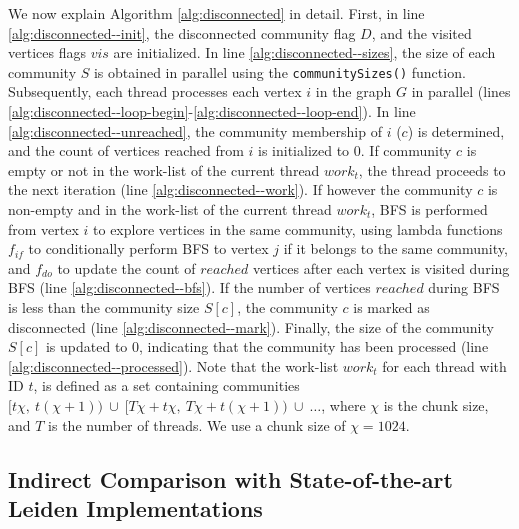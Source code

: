 We now explain Algorithm \ref{alg:disconnected} in detail. First, in line \ref{alg:disconnected--init}, the disconnected community flag $D$, and the visited vertices flags $vis$ are initialized. In line \ref{alg:disconnected--sizes}, the size of each community $S$ is obtained in parallel using the \texttt{communitySizes()} function. Subsequently, each thread processes each vertex $i$ in the graph $G$ in parallel (lines \ref{alg:disconnected--loop-begin}-\ref{alg:disconnected--loop-end}). In line \ref{alg:disconnected--unreached}, the community membership of $i$ ($c$) is determined, and the count of vertices reached from $i$ is initialized to $0$. If community $c$ is empty or not in the work-list of the current thread $work_t$, the thread proceeds to the next iteration (line \ref{alg:disconnected--work}). If however the community $c$ is non-empty and in the work-list of the current thread $work_t$, BFS is performed from vertex $i$ to explore vertices in the same community, using lambda functions $f_{if}$ to conditionally perform BFS to vertex $j$ if it belongs to the same community, and $f_{do}$ to update the count of $reached$ vertices after each vertex is visited during BFS (line \ref{alg:disconnected--bfs}). If the number of vertices $reached$ during BFS is less than the community size $S[c]$, the community $c$ is marked as disconnected (line \ref{alg:disconnected--mark}). Finally, the size of the community $S[c]$ is updated to $0$, indicating that the community has been processed (line \ref{alg:disconnected--processed}). Note that the work-list $work_t$ for each thread with ID $t$, is defined as a set containing communities $[t\chi,\ t(\chi+1))\ \cup\ [T\chi + t\chi,\ T\chi + t(\chi+1))\ \cup\ \ldots$, where $\chi$ is the chunk size, and $T$ is the number of threads. We use a chunk size of $\chi = 1024$.






\subsection{Indirect Comparison with State-of-the-art Leiden Implementations}
\label{sec:comparison-indirect}

